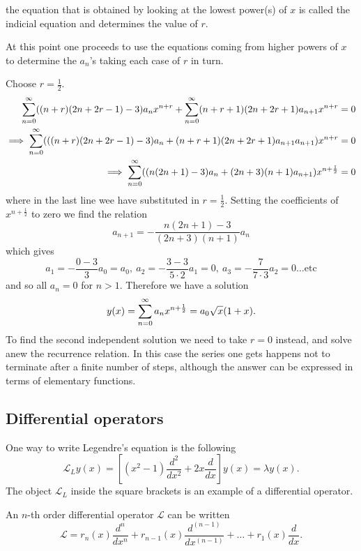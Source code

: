 \documentclass[10pt, a4paper]{article}
\begin{document}
\begin{example}
\begin{solution}
        the equation that is obtained by looking at the lowest power(s) of $x$ is called the indicial equation and determines the value of $r$.

        At this point one proceeds to use the equations coming from higher powers of $x$ to determine the $a_n$'s taking each case of $r$ in turn.

        Choose $r = \frac{1}{2}$.
        \begin{align*}
            \infsum[n = 0]((n + r)(2n + 2r - 1) - 3)a_nx ^ {n + r} + \infsum[n = 0](n + r + 1)(2n + 2r + 1)a_{n + 1}x ^ {n + r} &= 0 \\
            \implies \infsum[n = 0](((n + r)(2n + 2r - 1) - 3)a_n + (n + r + 1)(2n + 2r + 1)a_{n + 1}a_{n + 1})x ^ {n + r} &= 0 \\
            \implies \infsum[n = 0]((n(2n + 1) - 3)a_n + (2n + 3)(n + 1)a_{n + 1})x ^ {n + \frac{1}{2}} &= 0
        \end{align*}
        where in the last line wee have substituted in $r = \frac{1}{2}$.
        Setting the coefficients of $x ^ {n + \frac{1}{2}}$ to zero we find the relation
        \[
        a_{n + 1} = -\frac{n(2n + 1) - 3}{(2n + 3)(n + 1)}a_n
        \]
        which gives
        \[
        a_1 = -\frac{0 - 3}{3}a_0 = a_0,\ a_2 = -\frac{3 - 3}{5 \cdot 2}a_1 = 0,\ a_3 = -\frac{7}{7 \cdot 3}a_2 = 0\dotsc\text{etc}
        \]
        and so all $a_n = 0$ for $n > 1$.
        Therefore we have a solution
        \[
        y(x) = \infsum[n = 0]a_nx ^ {n + \frac{1}{2}} = a_0\sqrt{x}(1 + x).
        \]
        To find the second independent solution we need to take $r = 0$ instead,
        and solve anew the recurrence relation.
        In this case the series one gets happens not to terminate after a finite number of steps,
        although the answer can be expressed in terms of elementary functions.
    \end{solution}
\end{example}

\subsection{Differential operators}
One way to write Legendre's equation is the following
\[
\mathcal{L}_{L}y(x) = \left[(x ^ 2 - 1)\frac{d ^ 2}{dx ^ 2} + 2x\frac{d}{dx}\right]y(x) = \lambda y(x).
\]
The object $\mathcal{L}_L$ inside the square brackets is an example of a differential operator.

An $n$-th order differential operator $\mathcal{L}$ can be written
\[
\mathcal{L} = r_n(x)\frac{d ^ n}{dx ^ n} + r_{n - 1}(x)\frac{d ^ {(n - 1)}}{dx ^ {(n - 1)}} + \dotsc + r_1(x)\frac{d}{dx}.
\]
\end{document}
